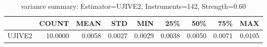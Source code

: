 \begin{table}[ht]
\centering
\caption{variance summary: Estimator=UJIVE2, Instruments=142, Strength=0.60}
\begin{tabular}{lrrrrrrrr}
\toprule
 & COUNT & MEAN & STD & MIN & 25\% & 50\% & 75\% & MAX \\
\midrule
UJIVE2 & 10.0000 & 0.0058 & 0.0027 & 0.0029 & 0.0038 & 0.0050 & 0.0071 & 0.0105 \\
\bottomrule
\end{tabular}
\end{table}
